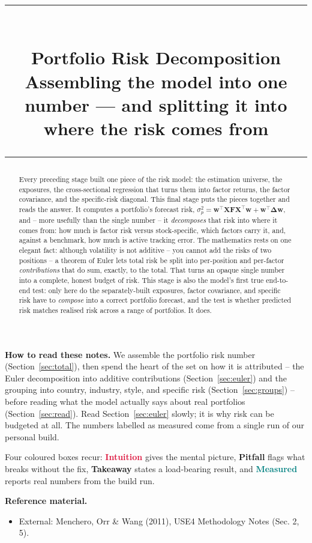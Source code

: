 \documentclass[11pt]{article}
\title{\vspace{-2.2em}
  {\color{steel}\rule{\textwidth}{1.3pt}}\\[0.7em]
  \Huge\bfseries Portfolio Risk Decomposition\\[0.35em]
  \large\mdseries Assembling the model into one number --- and splitting it into where the risk comes from\\[0.4em]
  {\color{steel}\rule{\textwidth}{0.7pt}}}
\author{}
\date{}
\theoremstyle{definition}
\theoremstyle{plain}
\theoremstyle{remark}
\newcommand{\T}{^{\!\top}}
\newcommand{\wvec}{\mathbf{w}}
\newcommand{\Xmat}{\mathbf{X}}
\newcommand{\Fmat}{\mathbf{F}}
\newcommand{\Del}{\boldsymbol{\Delta}}
\begin{document}
\maketitle
\thispagestyle{empty}

\begin{abstract}
Every preceding stage built one piece of the risk model: the estimation universe, the exposures, the cross-sectional regression that turns them into factor returns, the factor covariance, and the specific-risk diagonal. This final stage puts the pieces together and reads the answer. It computes a portfolio's forecast risk, $\sigma_p^2 = \wvec\T\Xmat\Fmat\Xmat\T\wvec + \wvec\T\Del\wvec$, and -- more usefully than the single number -- it \emph{decomposes} that risk into where it comes from: how much is factor risk versus stock-specific, which factors carry it, and, against a benchmark, how much is active tracking error. The mathematics rests on one elegant fact: although volatility is not additive -- you cannot add the risks of two positions -- a theorem of Euler lets total risk be split into per-position and per-factor \emph{contributions} that do sum, exactly, to the total. That turns an opaque single number into a complete, honest budget of risk. This stage is also the model's first true end-to-end test: only here do the separately-built exposures, factor covariance, and specific risk have to \emph{compose} into a correct portfolio forecast, and the test is whether predicted risk matches realised risk across a range of portfolios. It does.
\end{abstract}

\begin{tcolorbox}[colback=paperlt,colframe=ink!30,boxrule=0.4pt,arc=2pt,left=10pt,right=10pt,top=8pt,bottom=8pt]
\textbf{How to read these notes.} We assemble the portfolio risk number (Section~\ref{sec:total}), then spend the heart of the set on how it is attributed -- the Euler decomposition into additive contributions (Section~\ref{sec:euler}) and the grouping into country, industry, style, and specific risk (Section~\ref{sec:groups}) -- before reading what the model actually says about real portfolios (Section~\ref{sec:read}). Read Section~\ref{sec:euler} slowly; it is why risk can be budgeted at all. The numbers labelled as measured come from a single run of our personal build.

\smallskip
Four coloured boxes recur: \textcolor{crimson}{\textbf{Intuition}} gives the mental picture, \textcolor{amber}{\textbf{Pitfall}} flags what breaks without the fix, \textcolor{steel}{\textbf{Takeaway}} states a load-bearing result, and \textcolor{teal}{\textbf{Measured}} reports real numbers from the build run.

\smallskip
\textbf{Reference material.}
\begin{itemize}[leftmargin=1.4em,topsep=2pt]
  \item External: Menchero, Orr \& Wang (2011), USE4 Methodology Notes (Sec. 2, 5).
\end{itemize}
\end{tcolorbox}
\end{document}
